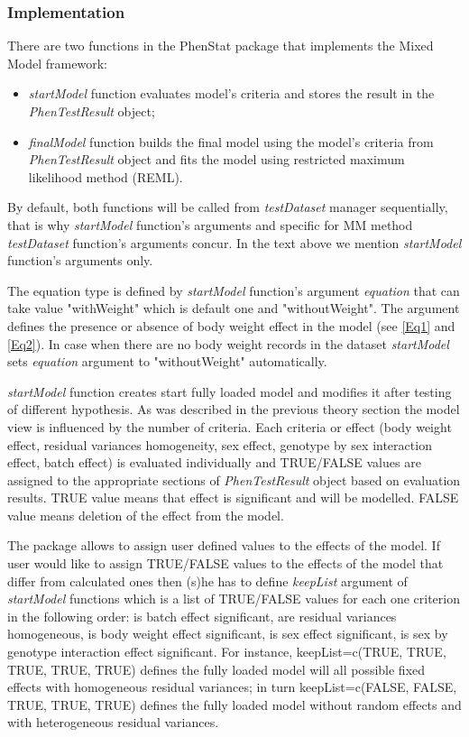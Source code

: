 \documentclass[12pt,a4paper]{article}
\begin{document}
\subsubsection{Implementation}
\label{sec:MMImplementation}
There are two functions in the PhenStat package that implements the Mixed Model framework:
\begin{itemize}
\item \textit{startModel} function evaluates model's criteria and stores the result in the \textit{PhenTestResult} object;
\item \textit{finalModel} function builds the final model using the model's criteria from \textit{PhenTestResult} object and fits the model using restricted maximum likelihood method (REML). 
\end{itemize}

By default, both functions will be called from \textit{testDataset} manager sequentially, that is why \textit{startModel} function's arguments and specific for MM method \textit{testDataset} function's arguments concur.
In the text above we mention \textit{startModel} function's arguments only. 

The equation type is defined by \textit{startModel} function's argument \textit{equation} that can take value "withWeight" which is default one and "withoutWeight". The argument defines the presence or absence of body weight effect in the model (see \ref{Eq1} and \ref{Eq2}). 
In case when there are no body weight records in the dataset \textit{startModel} sets \textit{equation} argument to "withoutWeight" automatically.

\textit{startModel} function creates start fully loaded model and modifies it after testing of different hypothesis. 
As was described in the previous theory section the model view is influenced by the number of criteria. 
Each criteria or effect (body weight effect, residual variances homogeneity, sex effect, genotype by sex interaction effect, batch effect) is evaluated individually
and TRUE/FALSE values are assigned to the appropriate sections of \textit{PhenTestResult} object based on evaluation results. 
TRUE value means that effect is significant and will be modelled. FALSE value means deletion of the effect from the model.

The package allows to assign user defined values to the effects of the model. 
If user would like to assign TRUE/FALSE values to the effects of the model that differ from calculated ones then (s)he has to define \textit{keepList} argument of \textit{startModel} functions 
which is a list of TRUE/FALSE values for each one criterion in the following order: is batch effect significant, are residual variances homogeneous, is body weight effect significant, 
is sex effect significant, is sex by genotype interaction effect significant. 
For instance, keepList=c(TRUE, TRUE, TRUE, TRUE, TRUE) defines the fully loaded model will all possible fixed effects with homogeneous residual variances; 
in turn keepList=c(FALSE, FALSE, TRUE, TRUE, TRUE) defines the fully loaded model without random effects and with heterogeneous residual variances.
\end{document}
